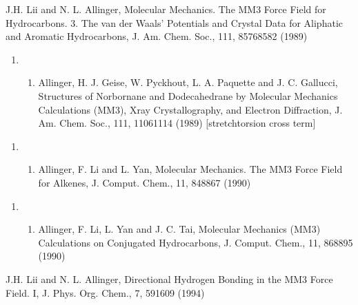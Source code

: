 \documentclass[letterpaper,11pt,english]{sphinxmanual}
\begin{document}
J.\sphinxhyphen{}H. Lii and N. L. Allinger, Molecular Mechanics. The MM3 Force Field for Hydrocarbons. 3. The van der Waals’ Potentials and Crystal Data for Aliphatic and Aromatic Hydrocarbons, J. Am. Chem. Soc., 111, 8576\sphinxhyphen{}8582 (1989)
\begin{enumerate}
%
\setcounter{enumi}{13}
\item {} \begin{enumerate}
%
\setcounter{enumii}{11}
\item {} 
Allinger, H. J. Geise, W. Pyckhout, L. A. Paquette and J. C. Gallucci, Structures of Norbornane and Dodecahedrane by Molecular Mechanics Calculations (MM3), X\sphinxhyphen{}ray Crystallography, and Electron Diffraction, J. Am. Chem. Soc., 111, 1106\sphinxhyphen{}1114 (1989)  {[}stretch\sphinxhyphen{}torsion cross term{]}

\end{enumerate}

\end{enumerate}
\begin{enumerate}
%
\setcounter{enumi}{13}
\item {} \begin{enumerate}
%
\setcounter{enumii}{11}
\item {} 
Allinger, F. Li and L. Yan, Molecular Mechanics. The MM3 Force Field for Alkenes, J. Comput. Chem., 11, 848\sphinxhyphen{}867 (1990)

\end{enumerate}

\end{enumerate}
\begin{enumerate}
%
\setcounter{enumi}{13}
\item {} \begin{enumerate}
%
\setcounter{enumii}{11}
\item {} 
Allinger, F. Li, L. Yan and J. C. Tai, Molecular Mechanics (MM3) Calculations on Conjugated Hydrocarbons, J. Comput. Chem., 11, 868\sphinxhyphen{}895 (1990)

\end{enumerate}

\end{enumerate}

J.\sphinxhyphen{}H. Lii and N. L. Allinger, Directional Hydrogen Bonding in the MM3 Force Field. I, J. Phys. Org. Chem., 7, 591\sphinxhyphen{}609 (1994)
\end{document}
